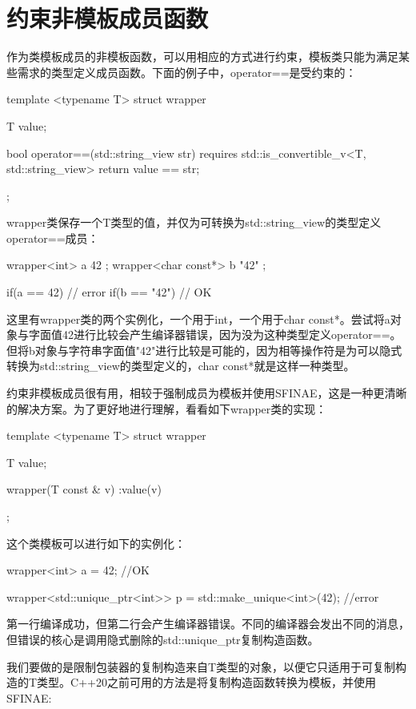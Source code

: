 \section{约束非模板成员函数}
作为类模板成员的非模板函数，可以用相应的方式进行约束，模板类只能为满足某些需求的类型定义成员函数。下面的例子中，operator==是受约束的：

\begin{cppcode}
template <typename T>
struct wrapper
{
	T value;
	
	bool operator==(std::string_view str)
	requires std::is_convertible_v<T, std::string_view>
	{
		return value == str;
	}
};
\end{cppcode}

wrapper类保存一个T类型的值，并仅为可转换为std::string_view的类型定义operator==成员：

\begin{cppcode}
wrapper<int> a{ 42 };
wrapper<char const*> b{ "42" };

if(a == 42) {} // error
if(b == "42") {} // OK
\end{cppcode}

这里有wrapper类的两个实例化，一个用于int，一个用于char const*。尝试将a对象与字面值42进行比较会产生编译器错误，因为没为这种类型定义operator==。但将b对象与字符串字面值"42"进行比较是可能的，因为相等操作符是为可以隐式转换为std::string_view的类型定义的，char const*就是这样一种类型。

约束非模板成员很有用，相较于强制成员为模板并使用SFINAE，这是一种更清晰的解决方案。为了更好地进行理解，看看如下wrapper类的实现：

\begin{cppcode}
template <typename T>
struct wrapper
{
	T value;
	
	wrapper(T const & v) :value(v) {}
};
\end{cppcode}

这个类模板可以进行如下的实例化：

\begin{cppcode}
wrapper<int> a = 42; //OK

wrapper<std::unique_ptr<int>> p =
	std::make_unique<int>(42); //error
\end{cppcode}

第一行编译成功，但第二行会产生编译器错误。不同的编译器会发出不同的消息，但错误的核心是调用隐式删除的std::unique_ptr复制构造函数。

我们要做的是限制包装器的复制构造来自T类型的对象，以便它只适用于可复制构造的T类型。C++20之前可用的方法是将复制构造函数转换为模板，并使用SFINAE:

